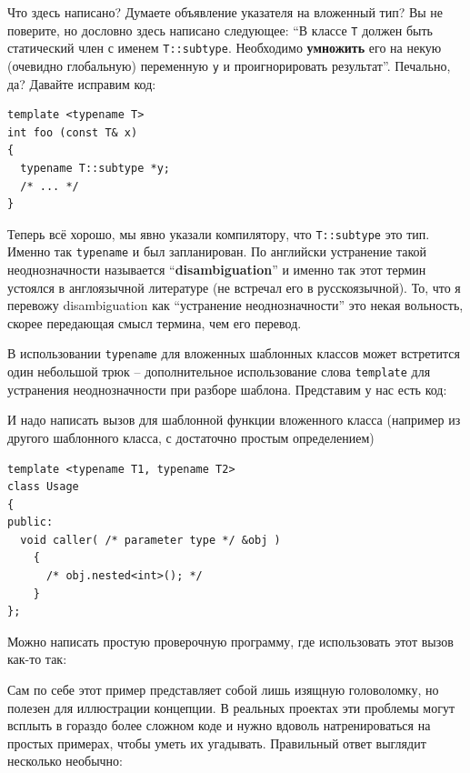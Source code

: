 \documentclass[a4paper,12pt,oneside]{article}
\begin{document}
Что здесь написано? Думаете объявление указателя на вложенный тип? Вы не поверите, но дословно здесь написано 
следующее: ``В классе \lstinline!T! должен быть статический член с именем \lstinline!T::subtype!. Необходимо \textbf{умножить} его на некую (очевидно глобальную) переменную \lstinline!y! и проигнорировать результат''. Печально, да? Давайте исправим код:

\begin{lstlisting}
template <typename T>
int foo (const T& x)
{
  typename T::subtype *y;
  /* ... */
}
\end{lstlisting}

Теперь всё хорошо, мы явно указали компилятору, что \lstinline!T::subtype! это тип. Именно так \lstinline!typename! и был запланирован. По английски устранение такой неоднозначности называется ``\textbf{disambiguation}''  и именно так этот термин устоялся в англоязычной литературе (не встречал его в русскоязычной). То, что я перевожу disambiguation как ``устранение неоднозначности'' это некая вольность, скорее передающая смысл термина, чем его перевод.

В использовании \lstinline!typename! для вложенных шаблонных классов может встретится один небольшой трюк -- дополнительное использование слова \lstinline!template! для устранения неоднозначности при разборе шаблона. Представим у нас есть код:



И надо написать вызов для шаблонной функции вложенного класса (например из другого шаблонного класса, с достаточно простым определением)

\begin{lstlisting}
template <typename T1, typename T2>
class Usage
{
public:
  void caller( /* parameter type */ &obj )
    {
      /* obj.nested<int>(); */
    }
};
\end{lstlisting}

Можно написать простую проверочную программу, где использовать этот вызов как-то так:



Сам по себе этот пример представляет собой лишь изящную головоломку, но полезен для иллюстрации концепции. В реальных проектах эти проблемы могут всплыть в гораздо более сложном коде и нужно вдоволь натренироваться на простых примерах, чтобы уметь их угадывать. Правильный ответ выглядит несколько необычно:
\end{document}
